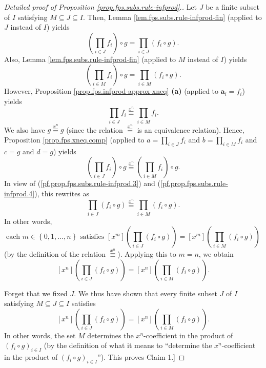 \begin{proof}[Detailed proof of Proposition \ref{prop.fps.subs.rule-infprod}.]
Let $J$ be a finite subset of $I$ satisfying $M\subseteq J\subseteq I$. Then,
Lemma \ref{lem.fps.subs.rule-infprod-fin} (applied to $J$ instead of $I$)
yields%
\begin{equation}
\left(  \prod_{i\in J}f_{i}\right)  \circ g=\prod_{i\in J}\left(  f_{i}\circ
g\right)  . \label{pf.prop.fps.subs.rule-infprod.3}%
\end{equation}
Also, Lemma \ref{lem.fps.subs.rule-infprod-fin} (applied to $M$ instead of
$I$) yields%
\begin{equation}
\left(  \prod_{i\in M}f_{i}\right)  \circ g=\prod_{i\in M}\left(  f_{i}\circ
g\right)  . \label{pf.prop.fps.subs.rule-infprod.4}%
\end{equation}
However, Proposition \ref{prop.fps.infprod-approx-xneq} \textbf{(a)} (applied
to $\mathbf{a}_{i}=f_{i}$) yields%
\[
\prod_{i\in J}f_{i}\overset{x^{n}}{\equiv}\prod_{i\in M}f_{i}.
\]
We also have $g\overset{x^{n}}{\equiv}g$ (since the relation $\overset{x^{n}%
}{\equiv}$ is an equivalence relation). Hence, Proposition
\ref{prop.fps.xneq.comp} (applied to $a=\prod_{i\in J}f_{i}$ and
$b=\prod_{i\in M}f_{i}$ and $c=g$ and $d=g$) yields%
\[
\left(  \prod_{i\in J}f_{i}\right)  \circ g\overset{x^{n}}{\equiv}\left(
\prod_{i\in M}f_{i}\right)  \circ g.
\]
In view of (\ref{pf.prop.fps.subs.rule-infprod.3}) and
(\ref{pf.prop.fps.subs.rule-infprod.4}), this rewrites as%
\[
\prod_{i\in J}\left(  f_{i}\circ g\right)  \overset{x^{n}}{\equiv}\prod_{i\in
M}\left(  f_{i}\circ g\right)  .
\]
In other words,
\[
\text{each }m\in\left\{  0,1,\ldots,n\right\}  \text{ satisfies }\left[
x^{m}\right]  \left(  \prod_{i\in J}\left(  f_{i}\circ g\right)  \right)
=\left[  x^{m}\right]  \left(  \prod_{i\in M}\left(  f_{i}\circ g\right)
\right)
\]
(by the definition of the relation $\overset{x^{n}}{\equiv}$). Applying this
to $m=n$, we obtain%
\[
\left[  x^{n}\right]  \left(  \prod_{i\in J}\left(  f_{i}\circ g\right)
\right)  =\left[  x^{n}\right]  \left(  \prod_{i\in M}\left(  f_{i}\circ
g\right)  \right)  .
\]

Forget that we fixed $J$. We thus have shown that every finite subset $J$ of
$I$ satisfying $M\subseteq J\subseteq I$ satisfies%
\[
\left[  x^{n}\right]  \left(  \prod_{i\in J}\left(  f_{i}\circ g\right)
\right)  =\left[  x^{n}\right]  \left(  \prod_{i\in M}\left(  f_{i}\circ
g\right)  \right)  .
\]
In other words, the set $M$ determines the $x^{n}$-coefficient in the product
of $\left(  f_{i}\circ g\right)  _{i\in I}$ (by the definition of what it
means to ``determine the $x^{n}$-coefficient in the product of
$\left(  f_{i}\circ g\right)  _{i\in I}$''). This proves Claim
1.] \medskip


\end{proof}
